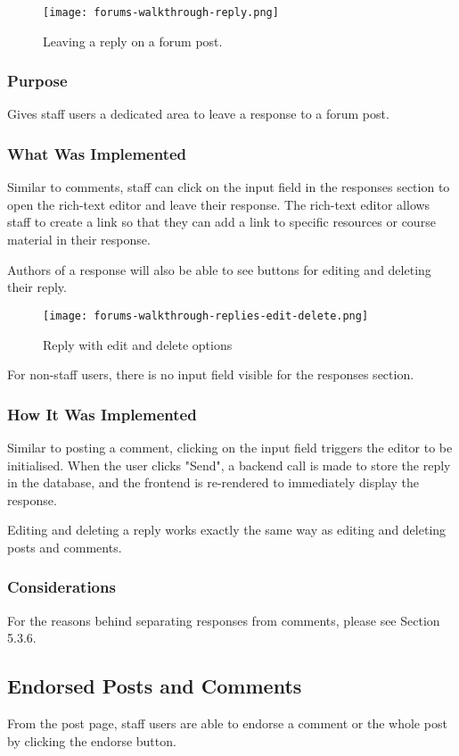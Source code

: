\begin{figure}[h!]
    \texttt{[image: forums-walkthrough-reply.png]}
    \centering
    \caption{Leaving a reply on a forum post.}
\end{figure}

\subsubsection{Purpose}
Gives staff users a dedicated area to leave a response to a forum post.

\subsubsection{What Was Implemented}
Similar to comments, staff can click on the input field in the responses section to open the rich-text editor and leave their response.
The rich-text editor allows staff to create a link so that they can add a link to specific resources or course material in their response.

Authors of a response will also be able to see buttons for editing and deleting their reply.

\begin{figure}[h!]
    \texttt{[image: forums-walkthrough-replies-edit-delete.png]}
    \centering
    \caption{Reply with edit and delete options}
\end{figure}

For non-staff users, there is no input field visible for the responses section.

\subsubsection{How It Was Implemented}
Similar to posting a comment, clicking on the input field triggers the editor to be initialised.
When the user clicks "Send", a backend call is made to store the reply in the database, and the frontend is re-rendered to immediately display the response.

Editing and deleting a reply works exactly the same way as editing and deleting posts and comments.

\subsubsection{Considerations}
For the reasons behind separating responses from comments, please see Section 5.3.6.

\subsection{Endorsed Posts and Comments}
From the post page, staff users are able to endorse a comment or the whole post by clicking the endorse button.

